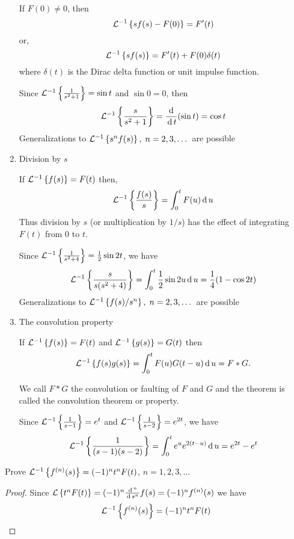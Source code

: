\documentclass[../main-sheet.tex]{subfiles}
\begin{document}
\begin{enumerate}
\begin{thm}
        If $ F(0)\neq 0 $, then
        \[\mathcal{L}^{-1}\left\{ sf(s)-F(0)\right\}=F'(t)\]
        or, 
        \[\mathcal{L}^{-1}\left\{ sf(s)\right\}=F'(t)+F(0)\delta (t)\]
        where $ \delta(t) $ is the Dirac delta function or unit impulse function.
    \end{thm}
    \begin{ex}
        Since $ \mathcal{L}^{-1}\left\{ \frac{1}{s^2+1}\right\}=\sin t $ and $ \sin 0=0 $, then
        \[
            \mathcal{L}^{-1}\left\{ \frac{s}{s^2+1}\right\}=\frac{\,\mathrm{d}\,}{\,\mathrm{d}\, t}(\sin t)=\cos t
        \]
        Generalizations to $ \mathcal{L}^{-1}\left\{ s^n f(s)\right\},\; n=2,3,\dots $ are possible
    \end{ex}
    \item Division by $ s $
    \begin{thm}
        If $ \mathcal{L}^{-1}\left\{ f(s)\right\}=F(t) $ then,
        \[
            \mathcal{L}^{-1}\left\{ \frac{f(s)}{s}\right\}=\int_0^t F(u)\,\mathrm{d}\, u
        \] 
        Thus division by $ s $ (or multiplication by $ 1/s $) has the effect of integrating $ F(t)  $ from 0 to $ t $.
    \end{thm}
    \begin{ex}
        Since $ \mathcal{L}^{-1}\left\{ \frac{1}{s^2+4}\right\}=\frac{1}{2}\sin 2t $, we have
        \[
            \mathcal{L}^{-1}\left\{ \frac{s}{s(s^2+4)}\right\}=\int_0^t \frac{1}{2}\sin 2u \,\mathrm{d}\, u=\frac{1}{4}(1-\cos 2t)
        \]
        Generalizations to $ \mathcal{L}^{-1}\left\{ f(s)/s^n\right\},\; n=2,3,\dots $ are possible
    \end{ex}
    \item The convolution property
    \begin{thm}
        If $ \mathcal{L}^{-1}\left\{ f(s)\right\}=F(t) $ and $ \mathcal{L}^{-1}\left\{ g(s)\right\}=G(t) $ then
        \[
            \mathcal{L}^{-1}\left\{ f(s)g(s)\right\}=\int_0^t F(u) G(t-u) \,\mathrm{d}\, u=F*G.
        \]
    \end{thm}
    
    We call $ F*G $ the convolution or faulting of $ F $ and $ G $ and the theorem is called the convolution theorem or property.
    \begin{ex}
        Since $ \mathcal{L}^{-1}\left\{ \frac{1}{s-1}\right\}=e^t $ and $ \mathcal{L}^{-1}\left\{ \frac{1}{s-2}\right\}=e^{2t} $, we have
        \[
            \mathcal{L}^{-1}\left\{ \frac{1}{(s-1)(s-2)}\right\}=\int_0^t e^u e^{2(t-u)}\,\mathrm{d}\, u=e^{2t} -e^t
        \]
    \end{ex}
\end{enumerate}
\begin{prob}
    Prove $\mathcal{L}^{-1}\left\{ f^{(n)}(s)\right\}=(-1)^n t^n F(t)$, $ n=1,2,3,\dots $
\end{prob}
\begin{proof}
    Since $ \mathcal{L}\left\{ t^n F(t)\right\}=(-1)^n \frac{\,\mathrm{d}\,^n}{\,\mathrm{d}\, s^n}f(s)=(-1)^n f^{(n)}(s) $ we have
    \[\mathcal{L}^{-1}\left\{ f^{(n)}(s)\right\}=(-1)^n t^n F(t)\]
\end{proof}
\end{document}
